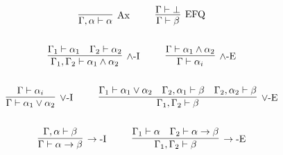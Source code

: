 \begin{gather*}
\infer[\mbox{Ax}]{\Gamma, \alpha \vdash \alpha}{}
~~~~ ~~~~
\infer[\mbox{EFQ}]{\Gamma \vdash \beta}{\Gamma \vdash \bot}
\\ \\ 
\infer[\wedge\mbox{-I}]{\Gamma_1, \Gamma_2 \vdash \alpha_1 \wedge \alpha_2}{
    \Gamma_1 \vdash \alpha_1
    &
    \Gamma_2 \vdash \alpha_2
}
~~~~ ~~~~
\infer[\wedge\mbox{-E}]{\Gamma \vdash \alpha_i}{
    \Gamma \vdash \alpha_1 \wedge \alpha_2
}
\\ \\ 
\infer[\vee\mbox{-I}]{\Gamma\vdash \alpha_1 \vee \alpha_2}{\Gamma \vdash \alpha_i}
~~~~ ~~~~
\infer[\vee\mbox{-E}]{\Gamma_1, \Gamma_2 \vdash \beta}{
    \Gamma_1 \vdash \alpha_1 \vee \alpha_2
    &
    \Gamma_2, \alpha_1 \vdash \beta
    &
    \Gamma_2, \alpha_2 \vdash \beta
}
\\ \\ 
\infer[\rightarrow\mbox{-I}]{\Gamma \vdash \alpha \rightarrow \beta}{\Gamma, \alpha \vdash \beta}
~~~~ ~~~~
\infer[\rightarrow\mbox{-E}]{\Gamma_1, \Gamma_2 \vdash \beta}{\Gamma_1 \vdash \alpha & \Gamma_2 \vdash \alpha \rightarrow \beta}
\end{gather*}